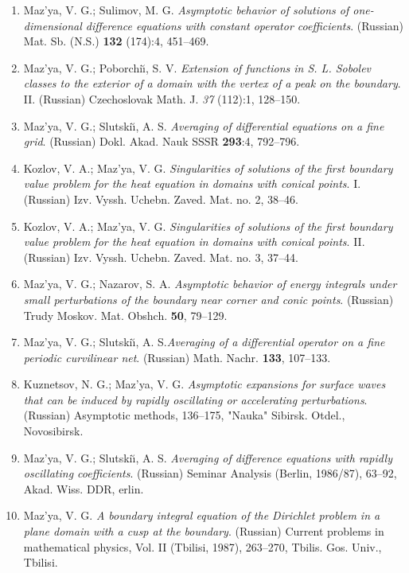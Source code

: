 \documentclass{article}
\begin{document}
\begin{enumerate}
{\bf 1987}
\item Maz'ya, V. G.; Sulimov, M. G. {\it Asymptotic behavior of
solutions
of one-dimensional difference equations
with constant operator coefficients}. (Russian) Mat. Sb. (N.S.) {\bf
132}
(174):4, 451--469.
\item Maz'ya, V. G.; Poborchi{\u\i}, S. V. {\it Extension of functions
in
S. L. Sobolev
classes to the exterior of a domain with the
vertex of a peak on the boundary}. II. (Russian) Czechoslovak Math. J.
{\it
37} (112):1, 128--150.
\item Maz'ya, V. G.; Slutski{\u\i}, A. S. {\it Averaging of
differential
equations on a fine grid}. (Russian) Dokl.
Akad. Nauk SSSR {\bf 293}:4, 792--796.
\item Kozlov, V. A.; Maz'ya, V. G. {\it Singularities of solutions of
the
first boundary value problem for
the heat equation in domains with conical points}. I. (Russian) Izv.
Vyssh.
Uchebn. Zaved. Mat. no. 2, 38--46.
\item Kozlov, V. A.; Maz'ya, V. G. {\it Singularities of solutions of
the
first boundary value problem for the heat
equation in domains with conical points}. II. (Russian) Izv. Vyssh.
Uchebn.
Zaved. Mat. no. 3, 37--44.
\item Maz'ya, V. G.; Nazarov, S. A. {\it Asymptotic behavior of energy
integrals under small
perturbations of the boundary near corner and conic points}. (Russian)
Trudy Moskov. Mat. Obshch. {\bf 50}, 79--129.
\item Maz'ya, V. G.; Slutski{\u\i}, A. S.{\it  Averaging of a
differential
operator on a fine periodic curvilinear net}. (Russian)
Math. Nachr. {\bf 133}, 107--133.
\item Kuznetsov, N. G.; Maz'ya, V. G. {\it Asymptotic expansions for
surface waves
that can be induced by rapidly oscillating or accelerating
perturbations}.
(Russian) Asymptotic methods, 136--175,
"Nauka" Sibirsk. Otdel., Novosibirsk.
\item Maz'ya, V. G.; Slutski{\u\i}, A. S. {\it Averaging of difference
equations with rapidly oscillating coefficients}.
(Russian) Seminar Analysis (Berlin, 1986/87), 63--92, Akad. Wiss. DDR,
erlin.
\item Maz'ya, V. G. {\it A boundary integral equation of the Dirichlet
problem in a plane domain with a cusp at the boundary}.
(Russian) Current problems in mathematical physics, Vol. II (Tbilisi,
1987), 263--270, Tbilis. Gos. Univ.,
Tbilisi.\hfill\break


\end{enumerate}
\end{document}
